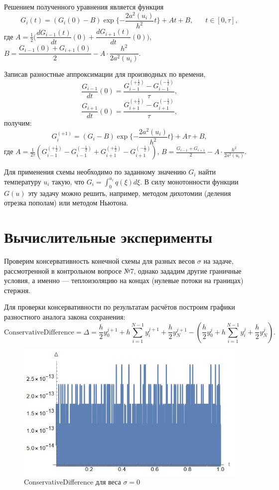 \documentclass[12pt, a4paper]{article}
\begin{document}
	Решением полученного уравнения является функция
	\[
		G_i(t) = (G_i(0)-B) \exp\{-\frac{2a^2(u_i)}{h^2}t\} + At + B, \phantom{xxx} t\in [0, \tau],
	\]
	где $A=\frac12 \big(\dfrac{dG_{i-1}(t)}{dt}(0)+\dfrac{dG_{i+1}(t)}{dt}(0)\big)$,
	\mbox{$B = \dfrac{G_{i-1}(0)+G_{i+1}(0)}{2}-A\cdot \dfrac{h^2}{2a^2(u_i)}$}.
	
	Записав разностные аппроксимации для производных по времени, 
	\[
	\dfrac{G_{i-1}}{dt}(0) = \frac{G_{i-1}^{(+\frac{1}{2})}-G_{i-1}^{(-\frac{1}{2})}}{\tau},
	\]
	\[
	\dfrac{G_{i+1}}{dt}(0) = \frac{G_{i+1}^{(+\frac{1}{2})}-G_{i+1}^{(-\frac{1}{2})}}{\tau},
	\]
	получим:
	\[
	G_i^{(+1)} = (G_i - B)\exp\{-\frac{2a^2(u_i)}{h^2}t\} + A\tau +B,
	\]
	где $A = \frac{1}{2\tau}(G_{i-1}^{(+\frac12)}  - G_{i-1}^{(-\frac12)} + G_{i+1}^{(+\frac12)} - G_{i+1}^{(-\frac12)})$, 
	\mbox{$B=\frac{G_{i-1}+G_{i+1}}{2} - A\cdot \frac{h^2}{2a^2(u_i)}$}.
	
	Для применения схемы необходимо по заданному значению $G_i$ найти температуру $u_i$ такую, что $G_i = \int_{0}^{u_i}q(\xi)d\xi$. В силу монотонности функции $G(u)$ эту задачу можно решить, например, методом дихотомии (деления отрезка пополам) или методом Ньютона.
	\clearpage
	
	\section{Вычислительные эксперименты}
	
	Проверим консервативность конечной схемы для разных весов $\sigma$ на задаче, рассмотренной в контрольном вопросе №7, однако зададим другие граничные условия, а именно --- теплоизоляцию на концах (нулевые потоки на границах) стержня.
	
	Для проверки консервативности по результатам расчётов построим графики разностного аналога закона сохранения:
	\[
	\text{ConservativeDifference} = \Delta = \frac{h}{2}y_0^{j+1} + h \sum_{i=1}^{N-1} y_i^{j+1}+\frac{h}{2}y_N^{j+1} - (\frac{h}{2}y_0^{j} + h \sum_{i=1}^{N-1} y_i^{j}+\frac{h}{2}y_N^{j}).
	\]
	
	
	\begin{figure}[H]
		\centering
		\includegraphics[width=1\textwidth]{conserv1}
		\caption{ConservativeDifference для веса $\sigma = 0$}
	\end{figure}
\end{document}

